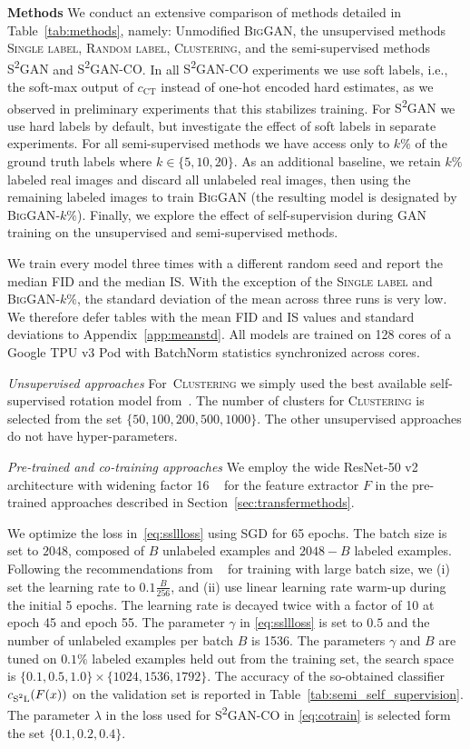 \documentclass{article}
\newcommand{\cCT}{c_\text{CT}}
\newcommand{\cSSL}{c_\text{S\textsuperscript{2}L}}
\newcommand{\cotrainSS}{\textsc{S\textsuperscript{2}GAN-CO}}
\newcommand{\tranSS}{\textsc{S\textsuperscript{2}GAN}}
\newcommand{\tranC}{\textsc{Clustering}}
\newcommand{\slabels}{\textsc{Single label}}
\newcommand{\rlabels}{\textsc{Random label}}
\newcommand{\biggan}{\textsc{BigGAN}}
\begin{document}
\textbf{Methods}\quad
We conduct an extensive comparison of methods detailed in Table~\ref{tab:methods}, namely: Unmodified \biggan, the unsupervised methods \slabels{}, \rlabels{}, \tranC{}, and the semi-supervised methods \tranSS{} and \cotrainSS{}. In all \cotrainSS{} experiments we use soft labels, i.e., the soft-max output of $\cCT$ instead of one-hot encoded hard estimates, as we observed in preliminary experiments that this stabilizes training. For \tranSS{} we use hard labels by default, but investigate the effect of soft labels in separate experiments. For all semi-supervised methods we have access only to $k\%$ of the ground truth labels where $k\in\{5, 10, 20\}$. As an additional baseline, we retain $k\%$ labeled real images and discard all unlabeled real images, then using the remaining labeled images to train \biggan{} (the resulting model is designated by \biggan-$k\%$). Finally, we explore the effect of self-supervision during GAN training on the unsupervised and semi-supervised methods. 

We train every model three times with a different random seed and report the median FID and the median IS. With the exception of the \slabels{} and \biggan-$k\%$, the standard deviation of the mean across three runs is very low. We therefore defer tables with the mean FID and IS values and standard deviations to Appendix~\ref{app:meanstd}. All models are trained on 128 cores of a Google TPU v3 Pod with BatchNorm statistics synchronized across cores.


\emph{Unsupervised approaches} For~\tranC{} we simply used the best available self-supervised rotation model from~\citet{kolesnikov2019revisiting}. The number of clusters for \tranC{} is selected from the set $\{50, 100, 200, 500, 1000\}$. The other unsupervised approaches do not have hyper-parameters.


\emph{Pre-trained and co-training approaches}
We employ the wide ResNet-50 v2 architecture with widening factor 16 ~\cite{zagoruyko2016wide} for the feature extractor $F$ in the pre-trained approaches described in Section~\ref{sec:transfermethods}. 

We optimize the loss in~\eqref{eq:ssllloss} using SGD for 65 epochs. The batch size is set to $2048$, composed of $B$ unlabeled examples and $2048-B$ labeled examples. Following the recommendations from ~\citet{goyal2017accurate} for training with large batch size, we (i) set the learning rate to $0.1\frac {B} {256}$, and (ii) use linear learning rate warm-up during the initial 5 epochs. The learning rate is decayed twice with a factor of 10 at epoch 45 and epoch 55. The parameter $\gamma$ in \eqref{eq:ssllloss} is set to $0.5$ and the number of unlabeled examples per batch $B$ is 1536. The parameters $\gamma$ and $B$ are tuned on $0.1\%$ labeled examples held out from the training set, the search space is $\{0.1, 0.5, 1.0\} \times \{1024, 1536, 1792\}$. The accuracy of the so-obtained classifier $\cSSL(F(x))$ on the \imagenet{} validation set is reported in Table~\ref{tab:semi_self_supervision}. The parameter $\lambda$ in the loss used for \cotrainSS{} in \eqref{eq:cotrain} is selected form the set $\{0.1, 0.2, 0.4\}$.
\end{document}
